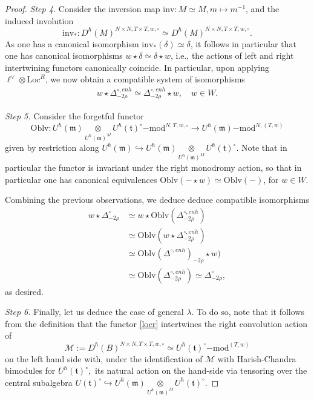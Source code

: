\documentclass{amsart}
\theoremstyle{definition}
\newcommand{\fm}{\mathfrak{m}}
\newcommand{\lmod}{\on{-mod}}
\newcommand{\ft}{\mathfrak{t}}
\newcommand{\sM}{\mathscr{M}}
\newcommand{\on}{\mathrm}
\numberwithin{equation}{section}
\begin{document}
\begin{proof}
{\it Step 4.} Consider the inversion map $\on{inv}: M \simeq M, m \mapsto m^{-1}$, and the induced involution $$\on{inv}_*: D^\hbar(M)^{N \times N, T \times T, w, \circ} \simeq D^\hbar(M)^{N \times N, T \times T, w, \circ}.$$As one has a canonical isomorphism $\on{inv}_*(\delta) \simeq \delta$, it follows in particular that one has canonical isomorphisms $w \star \delta \simeq \delta \star w$, i.e., the actions of left and right intertwining functors canonically coincide. In particular, upon applying $\ell^\vee \otimes \on{Loc}^R$, we now obtain a compatible system of isomorphisms
\begin{align*}w \star \Delta^{\circ,enh}_{-2\rho} \simeq \Delta^{\circ, enh}_{-2\rho} \star w, \quad w \in W.\end{align*}


{\it Step 5.} Consider the forgetful functor
$$\on{Oblv}: U^\hbar(\fm) \underset{U^\hbar(\fm)^M} \otimes U^\hbar(\ft)^\circ\lmod^{N, T, w, \circ} \rightarrow U^\hbar(\fm)\lmod^{N,(T,w)}$$given by restriction along $U^\hbar(\fm) \hookrightarrow U^\hbar(\fm) \underset{U^\hbar(\fm)^M} \otimes U^\hbar(\ft)^\circ$. Note that in particular the functor is invariant under the right monodromy action, so that in particular one has canonical equivalences $\on{Oblv}(- \star w) \simeq \on{Oblv}(-)$, for $w \in W$. 


Combining the previous observations, we deduce deduce compatible isomorphisms
\begin{align*}w \star \Delta^\circ_{-2\rho} &\simeq w \star \on{Oblv}(\Delta^{\circ, enh}_{-2\rho}) \\ &\simeq \on{Oblv}(w \star \Delta^{\circ, enh}_{-2\rho}) \\ &\simeq \on{Oblv}(\Delta^{\circ, enh})_{-2\rho} \star w) \\ &\simeq \on{Oblv}(\Delta^{\circ, enh}_{-2\rho}) \simeq \Delta^\circ_{-2\rho},\end{align*}
as desired. 


\iffalse 
{\it Step 6.} Finally, let us deduce the case of general $\lambda$. To do so, note that it follows from the definition that the functor \eqref{locr} intertwines the right convolution action of 
$$\sM := D^\hbar(B)^{N \times N, T \times T, w, \circ} \simeq U^\hbar(\ft)^{\circ}\lmod^{(T,w)}$$on the left hand side with, under the identification of $\sM$ with Harish-Chandra bimodules for $U^\hbar(\ft)^\circ,$ its natural action on the hand-side via tensoring over the central subalgebra $U(\ft)^\circ \hookrightarrow  U^\hbar(\fm) \underset{U^\hbar(\fm)^M} \otimes U^\hbar(\ft)^\circ.$ 


\end{proof}
\end{document}
